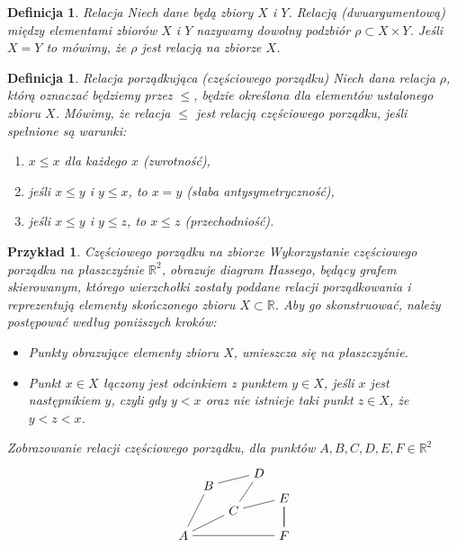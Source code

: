 \documentclass[12pt,a4paper]{report}
\newtheorem{definition}[theorem]{Definicja}
\newtheorem{example}{Przykład}
\begin{document}
\begin{definition}{Relacja \cite[Rozdział 3]{kuratowski2004}}
Niech dane będą zbiory $X$ i $Y$. Relacją (dwuargumentową) między elementami zbiorów $X$ i $Y$ nazywamy dowolny podzbiór $\rho \subset X \times Y $. Jeśli $X=Y$ to mówimy, że $\rho$ jest relacją na zbiorze $X$. 
\end{definition} 


\begin{definition}{Relacja porządkująca (częściowego porządku) \cite[Rozdział 2]{blaszczyk2007}}\label{def-relacja-czesciowego-porzadku}
Niech dana relacja $\rho$, którą oznaczać będziemy przez $\leq$, będzie określona dla elementów ustalonego zbioru $X$. Mówimy, że relacja $\leq$ jest relacją częściowego porządku, jeśli spełnione są warunki:
\begin{enumerate}
\item $x \leq x$ dla każdego $x$ (zwrotność),
\item jeśli $x \leq y$ i $y \leq x$, to $x=y$ (słaba antysymetryczność),
\item jeśli $x \leq y$ i $y \leq z$, to $x \leq z$ (przechodniość).
\end{enumerate}
\end{definition}


\begin{example}{Częściowego porządku na zbiorze}
Wykorzystanie częściowego porządku na płaszczyźnie $\mathbb{R}^2$, obrazuje diagram Hassego, będący grafem skierowanym, którego wierzchołki zostały poddane relacji porządkowania i reprezentują elementy  skończonego zbioru $X \subset \mathbb{R}$. 
Aby go skonstruować, należy postępować według poniższych kroków:
\begin{itemize}
\item Punkty obrazujące elementy zbioru $X$, umieszcza się na płaszczyźnie.
\item Punkt $x\in X$ łączony jest odcinkiem z punktem $y \in X$, jeśli $x$ jest następnikiem $y$, czyli gdy $y <x$ oraz nie istnieje taki punkt $z \in X$, że $y<z<x$.
\end{itemize}
Zobrazowanie relacji częściowego porządku, dla punktów $A, B, C, D, E, F \in \mathbb{R}^2$
$$
\begin{tikzpicture}[scale=.7]
  \node (A) at (-1,0) {$A$};
  \node (B) at (0,2) {$B$};
  \node (C) at (1,1) {$C$};
 \node (E) at (3,1.5) {$E$};
 \node (F) at (3,0) {$F$};
 \node (D) at (2,2.5) {$D$};
  \draw (C)--(A)--(B)--(D)--(C) --(E)-- (F); 
  \draw (A)--(F)--(E);
\end{tikzpicture}
$$

\end{example}
\end{document}

